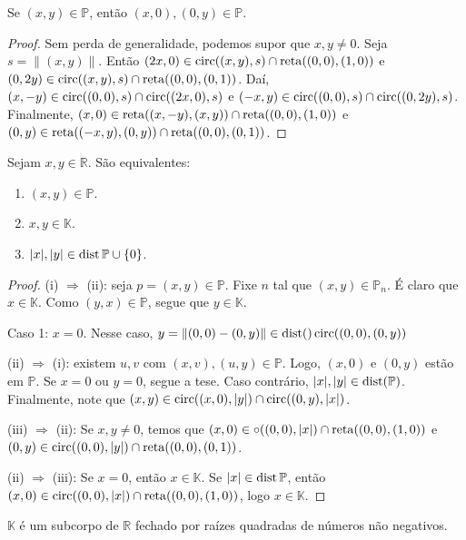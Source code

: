 \begin{lemma}
Se $(x, y) \in \mathbb P$, então $(x, 0), (0, y) \in \mathbb P$.
\end{lemma}

\begin{proof}
Sem perda de generalidade, podemos supor que $x, y\neq 0$. Seja $s=\|(x, y)\|$.
Então $(2x, 0) \in \operatorname{circ}((x, y), s)\cap \operatorname{reta}((0, 0), (1, 0))$ e $(0, 2y) \in \operatorname{circ}((x, y), s)\cap \operatorname{reta}((0, 0), (0, 1))$.
Daí, $(x, -y)\in \operatorname{circ}((0, 0), s)\cap \operatorname{circ}((2x, 0), s)$ e $(-x, y)\in \operatorname{circ}((0, 0), s)\cap \operatorname{circ}((0, 2y), s)$.
Finalmente, $(x, 0) \in \operatorname{reta}((x, -y), (x, y))\cap \operatorname{reta}((0, 0), (1, 0))$ e $(0, y) \in \operatorname{reta}((-x, y), (0, y))\cap \operatorname{reta}((0, 0), (0, 1))$.
\end{proof}
\begin{prop}
    Sejam $x, y \in \mathbb R$. São equivalentes:
    \begin{enumerate}[label=(\roman*)]
        \item $(x, y)\in \mathbb P$.
        \item $x, y \in \mathbb K$.
        \item $|x|, |y| \in \operatorname{dist} \mathbb P\cup\{0\}$.
    \end{enumerate}
    
\end{prop}
\begin{proof}
    (i) $\Rightarrow$ (ii): seja $p=(x, y) \in \mathbb P$. Fixe $n$ tal que $(x, y)\in \mathbb P_n$. É claro que $x\in \mathbb K$. Como $(y, x)\in \mathbb P$, segue que $y \in \mathbb K$.

    Caso 1: $x=0$. Nesse caso, $y=\|(0, 0)-(0, y)\|\in \operatorname{dist}() \operatorname{circ}((0, 0), (0, y))$

    (ii) $\Rightarrow$ (i): existem $u, v$ com $(x, v), (u, y) \in \mathbb P$. Logo, $(x, 0)$ e $(0, y)$ estão em $\mathbb P$. Se $x=0$ ou $y=0$, segue a tese. Caso contrário, $|x|, |y|\in \operatorname{dist}(\mathbb P)$. Finalmente, note que $(x, y)\in \operatorname{circ}((x, 0), |y|)\cap \operatorname{circ}((0, y), |x|)$.

    (iii) $\Rightarrow$ (ii): Se $x, y\neq 0$, temos que $(x, 0) \in \circ((0, 0), |x|)\cap \operatorname{reta}((0, 0), (1, 0))$ e $(0, y) \in \operatorname{circ}((0, 0), |y|)\cap \operatorname{reta}((0, 0), (0, 1))$.

    (ii) $\Rightarrow$ (iii): Se $x=0$, então $x \in \mathbb K$. Se $|x| \in \operatorname{dist} \mathbb P$, então $(x, 0)\in \operatorname{circ}((0, 0), |x|)\cap \operatorname{reta}((0, 0), (1, 0))$, logo $x \in \mathbb K$.
\end{proof}

\begin{prop}
    $\mathbb K$ é um subcorpo de $\mathbb R$ fechado por raízes quadradas de números não negativos.
\end{prop}

